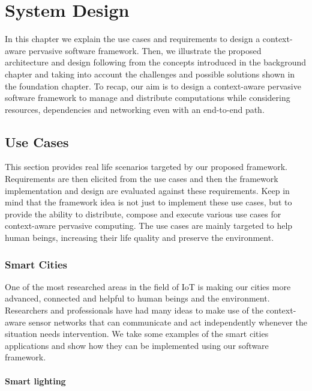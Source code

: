 
 \chapter{System Design}\label{chapter:Approach}
 In this chapter we explain the use cases and requirements to design a context-aware pervasive software framework. Then, we illustrate the  proposed architecture and design following from the concepts introduced in the background chapter and taking into account the challenges and possible solutions shown in the foundation chapter. To recap,  our aim is to design a context-aware pervasive software framework to manage and distribute computations while considering resources, dependencies and networking even with an end-to-end path.

\section{Use Cases}
This section provides real life scenarios targeted by our proposed framework. Requirements are then elicited from the use cases and then the framework implementation and design are evaluated against these requirements. Keep in mind that the framework idea is not just to implement these use cases, but to provide the ability to distribute, compose and execute various use cases for context-aware pervasive computing. The use cases are mainly targeted to help human beings, increasing their life quality and preserve the environment. 

\subsection{Smart Cities}
One of the most researched areas in the field of IoT is making our cities more advanced, connected and helpful to human beings and the environment. Researchers and professionals have had many ideas to make use of the context-aware sensor networks that can communicate and act independently whenever the situation needs intervention. We take some examples of the smart cities applications and show how they can be implemented using our software framework.

\subsubsection{Smart lighting}


